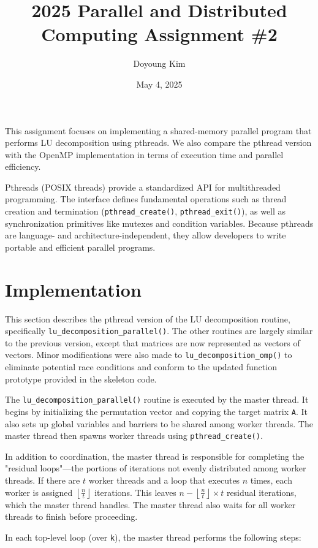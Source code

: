 \documentclass{article}
\title{\textbf{2025 Parallel and Distributed Computing Assignment \#2}}
\date{May 4, 2025}
\author{Doyoung Kim}
\providecommand{\floor}[1]{\left \lfloor #1 \right \rfloor}
\begin{document}
\maketitle

This assignment focuses on implementing a shared-memory parallel program that 
performs LU decomposition using pthreads. We also compare the pthread version 
with the OpenMP implementation in terms of execution time and parallel efficiency.

Pthreads (POSIX threads) provide a standardized API for multithreaded 
programming. The interface defines fundamental operations such as thread 
creation and termination (\verb|pthread_create()|, \verb|pthread_exit()|), as 
well as synchronization primitives like mutexes and condition variables. Because 
pthreads are language- and architecture-independent, they allow developers to 
write portable and efficient parallel programs.

\section{Implementation}

This section describes the pthread version of the LU decomposition routine, 
specifically \verb|lu_decomposition_parallel()|. The other routines are largely 
similar to the previous version, except that matrices are now represented as 
vectors of vectors. Minor modifications were also made to 
\verb|lu_decomposition_omp()| to eliminate potential race conditions and 
conform to the updated function prototype provided in the skeleton code.

The \verb|lu_decomposition_parallel()| routine is executed by the master thread. 
It begins by initializing the permutation vector and copying the target matrix 
\verb|A|. It also sets up global variables and barriers to be shared among 
worker threads. The master thread then spawns worker threads using 
\verb|pthread_create()|.

In addition to coordination, the master thread is responsible for completing the 
"residual loops"—the portions of iterations not evenly distributed among worker 
threads. If there are $t$ worker threads and a loop that executes $n$ times, 
each worker is assigned $\floor{\frac{n}{t}}$ iterations. This leaves 
$n - \floor{\frac{n}{t}} \times t$ residual iterations, which the master thread 
handles. The master thread also waits for all worker threads to finish before 
proceeding.

In each top-level loop (over \verb|k|), the master thread performs the following 
steps:
\end{document}
